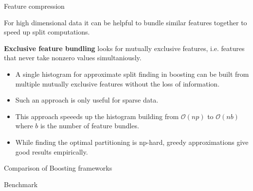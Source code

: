 \begin{vbframe}{Feature compression}

For high dimensional data it can be helpful to bundle similar features together to speed up split computations.

\lz

\textbf{Exclusive feature bundling} looks for mutually exclusive features, i.e. features that never take nonzero values simultaniously.

\lz

\begin{itemize}
  \item A single histogram for approximate split finding in boosting can be built from multiple mutually exclusive features without the loss of information.
  \item Such an approach is only useful for sparse data.
  \item This approach speeeds up the histogram building from $\mathcal{O}(np)$ to $\mathcal{O}(nb)$ where $b$ is the number of feature bundles.
  \item While finding the optimal partitioning is np-hard, greedy approximations give good results empirically.
\end{itemize}

\end{vbframe}


\begin{vbframe}{Comparison of Boosting frameworks}

\end{vbframe}

\begin{vbframe}{Benchmark}

\end{vbframe}

\endlecture

